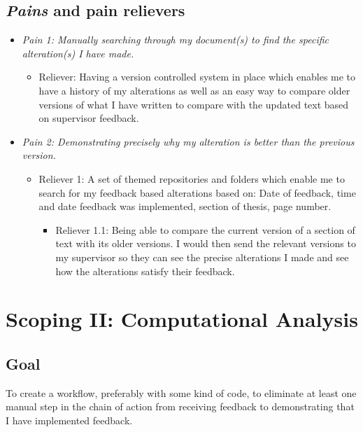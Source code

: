 \documentclass{article}
\begin{document}
\subsection{\textit {Pains} and pain relievers}

\begin{itemize}
    \item \textit{Pain 1: Manually searching through my document(s) to find the specific alteration(s) I have made.} 
    \begin{itemize}
        \item  Reliever: Having a version controlled system in place which enables me to have a history of my alterations as well as an easy way to compare older versions of what I have written to compare with the updated text based on supervisor feedback. 
    \end{itemize}
    \item \textit{Pain 2: Demonstrating precisely why my alteration is better than the previous version.} 
    \begin{itemize}
        \item  Reliever 1: A set of themed repositories and folders which enable me to search for my feedback based alterations based on: Date of feedback, time and date feedback was implemented, section of thesis, page number.
        \begin{itemize}
        \item Reliever 1.1: Being able to compare the current version of a section of text with its older versions. I would then send the relevant versions to my supervisor so they can see the precise alterations I made and see how the alterations satisfy their feedback.
        \end{itemize}
    \end{itemize}
\end{itemize}

\section{Scoping II: Computational Analysis}


\subsection{Goal}

To create a workflow, preferably with some kind of code, to eliminate at least one manual step in the chain of action from receiving feedback to demonstrating that I have implemented feedback.
\end{document}
